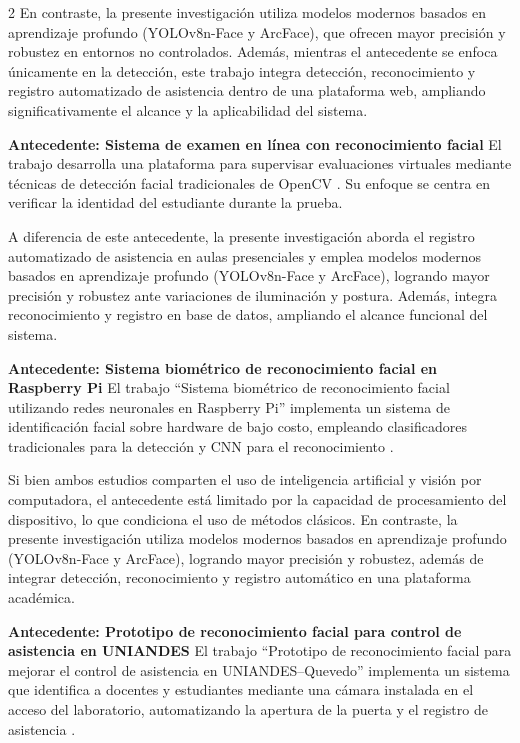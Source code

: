 \documentclass[10pt,a4paper]{article}
\begin{document}
\begin{multicols}{2}
En contraste, la presente investigación utiliza modelos modernos basados en aprendizaje profundo (YOLOv8n-Face y ArcFace), que ofrecen mayor precisión y robustez en entornos no controlados. Además, mientras el antecedente se enfoca únicamente en la detección, este trabajo integra detección, reconocimiento y registro automatizado de asistencia dentro de una plataforma web, ampliando significativamente el alcance y la aplicabilidad del sistema.

\textbf{Antecedente: Sistema de examen en línea con reconocimiento facial} El trabajo desarrolla una plataforma para supervisar evaluaciones virtuales mediante técnicas de detección facial tradicionales de OpenCV \cite{examOnline}. Su enfoque se centra en verificar la identidad del estudiante durante la prueba.

A diferencia de este antecedente, la presente investigación aborda el registro automatizado de asistencia en aulas presenciales y emplea modelos modernos basados en aprendizaje profundo (YOLOv8n-Face y ArcFace), logrando mayor precisión y robustez ante variaciones de iluminación y postura. Además, integra reconocimiento y registro en base de datos, ampliando el alcance funcional del sistema.

\textbf{Antecedente: Sistema biométrico de reconocimiento facial en Raspberry Pi} El trabajo “Sistema biométrico de reconocimiento facial utilizando redes neuronales en Raspberry Pi” implementa un sistema de identificación facial sobre hardware de bajo costo, empleando clasificadores tradicionales para la detección y CNN para el reconocimiento \cite{sistemaBiometricoRaspberry}.

Si bien ambos estudios comparten el uso de inteligencia artificial y visión por computadora, el antecedente está limitado por la capacidad de procesamiento del dispositivo, lo que condiciona el uso de métodos clásicos. En contraste, la presente investigación utiliza modelos modernos basados en aprendizaje profundo (YOLOv8n-Face y ArcFace), logrando mayor precisión y robustez, además de integrar detección, reconocimiento y registro automático en una plataforma académica.

\textbf{Antecedente: Prototipo de reconocimiento facial para control de asistencia en UNIANDES} El trabajo “Prototipo de reconocimiento facial para mejorar el control de asistencia en UNIANDES–Quevedo” implementa un sistema que identifica a docentes y estudiantes mediante una cámara instalada en el acceso del laboratorio, automatizando la apertura de la puerta y el registro de asistencia \cite{prototipoUNIANDES}.


\end{multicols}
\end{document}
